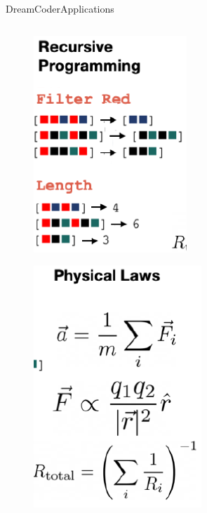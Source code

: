 \documentclass[AERbeamer%
              ,optEnglish%
              ,optBiber%
              ,optBibstyleAlphabetic%
              ,optBeamerClassicFormat%
              ]{AERlatex}%
\begin{document}
\begin{frame}[c]{DreamCoder}{Applications}
\begin{columns}[T]
\begin{column}{0.33\textwidth}
\begin{figure}
                \includegraphics[height=0.35\textheight]{DreamCoderApp7.png}
            \end{figure}
            \begin{figure}
                \centering
                \includegraphics[height=0.35\textheight]{DreamCoderApp8.png}
            \end{figure}
        \end{column}
    \end{columns}
\end{frame}
\end{document}
